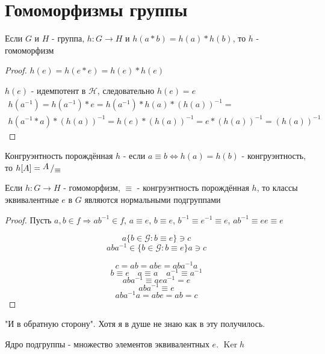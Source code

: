 \documentclass[../main/document.tex]{subfiles}
\begin{document}
\section{Гомоморфизмы группы}
\begin{thm}
Если $G$ и $H$ - группа, $h:G\rightarrow H$ и $h(a*b)=h(a)*h(b)$, то $h$ - гомоморфизм
\begin{proof}
$h(e)=h(e*e)=h(e)*h(e)$

$h(e)$ - идемпотент в $\mathcal{H}$, следовательно $h(e)=e$
\begin{multline*}
h(a^{-1})=h(a^{-1})*e=h(a^{-1})*h(a)*(h(a))^{-1}=\\
h(a^{-1}*a)*(h(a))^{-1}=h(e)*(h(a))^{-1}=e*(h(a))^{-1}=(h(a))^{-1}
\end{multline*}
\end{proof}
\end{thm}

\begin{dfn}
Конгруэнтность порождённая $h$ - если $a\equiv b \Leftrightarrow h(a)=h(b)$ - конгруэнтность, то $h[A]= \bigslant{A}{\equiv}$ 
\end{dfn}

\begin{thm}
Если $h:G\rightarrow H$ - гомоморфизм, $\equiv$ - конгруэнтность порождённая $h$, то классы эквивалентные $e$ в $G$ являются нормальными подгруппами
\begin{proof}
Пусть $a,b\in f\Rightarrow ab^{-1}\in f$, $a\equiv e$, $b\equiv e$, $b^{-1}\equiv e^{-1}\equiv e$, $ab^{-1}\equiv ee\equiv e$

$$a\{b\in \mathcal{G}:b\equiv e\}\ni c$$
$$aba^{-1}\in\{b\in \mathcal{G}:b\equiv e\}a\ni c$$

$$c=ab=abe=aba^{-1}a$$
$$b\equiv e \quad a\equiv a\quad a^{-1}\equiv a^{-1}$$
$$aba^{-1}\equiv aea^{-1}=e$$
$$aba^{-1}\equiv e$$
$$aba^{-1}a=abe=ab=c$$
\end{proof}
"И в обратную сторону". Хотя я в душе не знаю как в эту получилось.
\end{thm}

\begin{dfn}
Ядро подгруппы - множество элементов эквивалентных $e$. $\operatorname{Ker}h$
\end{dfn}
\end{document}
